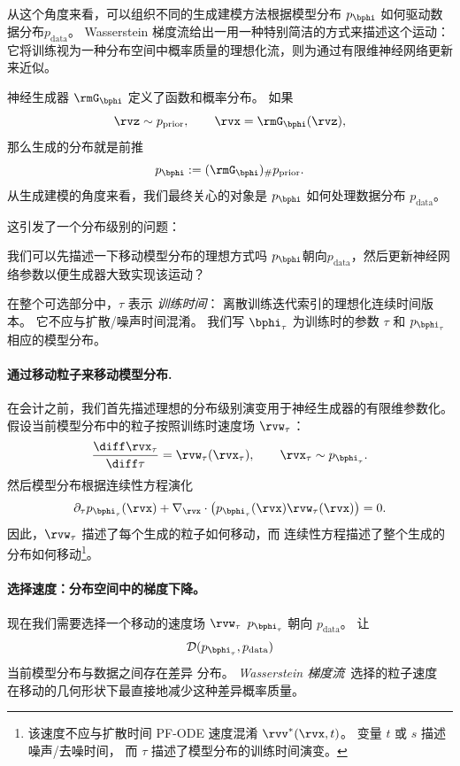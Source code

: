 从这个角度来看，可以组织不同的生成建模方法根据模型分布 $p_{\bphi}$ 如何驱动数据分布$p_{\mathrm{data}}$。  Wasserstein 梯度流给出一用一种特别简洁的方式来描述这个运动：它将训练视为一种分布空间中概率质量的理想化流，则为通过有限维神经网络更新来近似。


神经生成器 $\rmG_{\bphi}$ 定义了函数和概率分布。  如果
\[
    \rvz\sim p_{\mathrm{prior}},
    \qquad
    \rvx=\rmG_{\bphi}(\rvz),
\]
那么生成的分布就是前推
\[
    p_{\bphi}:=(\rmG_{\bphi})_\# p_{\mathrm{prior}}.
\]
从生成建模的角度来看，我们最终关心的对象是
$p_{\bphi}$ 如何处理数据分布 $p_{\mathrm{data}}$。

这引发了一个分布级别的问题：
\begin{question}
我们可以先描述一下移动模型分布的理想方式吗
$p_{\bphi}$朝向$p_{\mathrm{data}}$，然后更新神经网络参数以便生成器大致实现该运动？
\end{question}

在整个可选部分中，$\tau$ 表示 \emph{ 训练时间}：
离散训练迭代索引的理想化连续时间版本。  它不应与扩散/噪声时间混淆。  我们写 $\bphi_\tau$ 为训练时的参数 $\tau$ 和 $p_{\bphi_\tau}$
相应的模型分布。

\paragraph{通过移动粒子来移动模型分布.}
在会计之前，我们首先描述理想的分布级别演变用于神经生成器的有限维参数化。
假设当前模型分布中的粒子按照训练时速度场 $\rvw_\tau$：
\[
    \frac{\diff \rvx_\tau}{\diff \tau}
    =
    \rvw_\tau(\rvx_\tau),
    \qquad
    \rvx_\tau\sim p_{\bphi_\tau}.
\]
然后模型分布根据连续性方程演化
\[
    \partial_\tau p_{\bphi_\tau}(\rvx)
    +
    \nabla_{\rvx}\cdot
    \big(
        p_{\bphi_\tau}(\rvx)\rvw_\tau(\rvx)
    \big)
    =
    0.
\]
因此，$\rvw_\tau$ 描述了每个生成的粒子如何移动，而
连续性方程描述了整个生成的分布如何移动\footnote{该速度不应与扩散时间 PF-ODE 速度混淆
$\rvv^*(\rvx,t)$。  变量 $t$ 或 $s$ 描述噪声/去噪时间，
而 $\tau$ 描述了模型分布的训练时间演变。}。\paragraph{选择速度：分布空间中的梯度下降。}
现在我们需要选择一个移动的速度场 $\rvw_\tau$
$p_{\bphi_\tau}$ 朝向 $p_{\mathrm{data}}$。  让
\[
    \mathcal{D}(p_{\bphi_\tau},p_{\mathrm{data}})
\]
当前模型分布与数据之间存在差异
分布。  \emph{Wasserstein 梯度流}~\citep{jordan1998variational,ambrosio2005gradient}选择的粒子速度
在移动的几何形状下最直接地减少这种差异概率质量。

